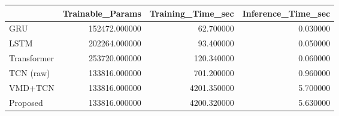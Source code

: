 \begin{tabular}{lrrr}
\toprule
 & Trainable_Params & Training_Time_sec & Inference_Time_sec \\
\midrule
GRU & 152472.000000 & 62.700000 & 0.030000 \\
LSTM & 202264.000000 & 93.400000 & 0.050000 \\
Transformer & 253720.000000 & 120.340000 & 0.060000 \\
TCN (raw) & 133816.000000 & 701.200000 & 0.960000 \\
VMD+TCN & 133816.000000 & 4201.350000 & 5.700000 \\
Proposed & 133816.000000 & 4200.320000 & 5.630000 \\
\bottomrule
\end{tabular}
